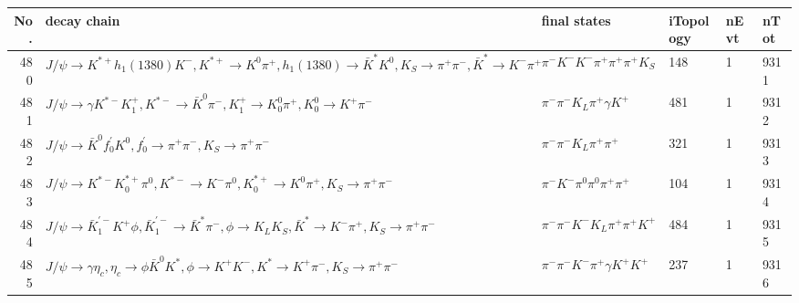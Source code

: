 \begin{table}[htbp] 
\begin{center}
\begin{small}
\begin{tabular}{rlllll}\hline\hline
 No. & decay chain & final states &  iTopology & nEvt & nTot \\\hline
480&$J/\psi       \rightarrow K^{*+}         h_{1}(1380)    K^{-}          , K^{*+}          \rightarrow K^{0}          \pi^{+}        , h_{1}(1380)     \rightarrow \bar{K}^{*}   K^{0}          , K_{S}           \rightarrow \pi^{+}        \pi^{-}        , \bar{K}^{*}    \rightarrow K^{-}          \pi^{+}        $&$\pi^{-}        K^{-}          K^{-}          \pi^{+}        \pi^{+}        \pi^{+}        K_{S}          $&  148&    1& 9311\\
481&$J/\psi       \rightarrow \gamma       K^{*-}         K_1^{+}        , K^{*-}          \rightarrow \bar{K}^{0}   \pi^{-}        , K_1^{+}         \rightarrow K_0^{0}        \pi^{+}        , K_0^{0}         \rightarrow K^{+}          \pi^{-}        $&$\pi^{-}        \pi^{-}        K_{L}          \pi^{+}        \gamma       K^{+}          $&  481&    1& 9312\\
482&$J/\psi       \rightarrow \bar{K}^{0}   f^{'}_{0}     K^{0}          , f^{'}_{0}      \rightarrow \pi^{+}        \pi^{-}        , K_{S}           \rightarrow \pi^{+}        \pi^{-}        $&$\pi^{-}        \pi^{-}        K_{L}          \pi^{+}        \pi^{+}        $&  321&    1& 9313\\
483&$J/\psi       \rightarrow K^{*-}         K_{0}^{*+}     \pi^{0}        , K^{*-}          \rightarrow K^{-}          \pi^{0}        , K_{0}^{*+}      \rightarrow K^{0}          \pi^{+}        , K_{S}           \rightarrow \pi^{+}        \pi^{-}        $&$\pi^{-}        K^{-}          \pi^{0}        \pi^{0}        \pi^{+}        \pi^{+}        $&  104&    1& 9314\\
484&$J/\psi       \rightarrow \bar{K}_1^{'-}K^{+}          \phi           , \bar{K}_1^{'-} \rightarrow \bar{K}^{*}   \pi^{-}        , \phi            \rightarrow K_{L}          K_{S}          , \bar{K}^{*}    \rightarrow K^{-}          \pi^{+}        , K_{S}           \rightarrow \pi^{+}        \pi^{-}        $&$\pi^{-}        \pi^{-}        K^{-}          K_{L}          \pi^{+}        \pi^{+}        K^{+}          $&  484&    1& 9315\\
485&$J/\psi       \rightarrow \gamma       \eta_{c}    , \eta_{c}     \rightarrow \phi           \bar{K}^{0}   K^{*}          , \phi            \rightarrow K^{+}          K^{-}          , K^{*}           \rightarrow K^{+}          \pi^{-}        , K_{S}           \rightarrow \pi^{+}        \pi^{-}        $&$\pi^{-}        \pi^{-}        K^{-}          \pi^{+}        \gamma       K^{+}          K^{+}          $&  237&    1& 9316\\

\end{tabular}
\end{small}
\end{center}
\end{table}
